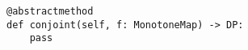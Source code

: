 \par\begin{minipage}{60ex}
\begin{verbatim}
@abstractmethod
def conjoint(self, f: MonotoneMap) -> DP:
    pass
\end{verbatim}
\end{minipage}\par